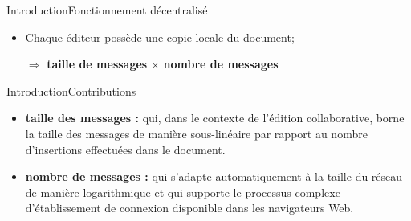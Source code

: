 \begin{frame}{Introduction}{Fonctionnement décentralisé}
  
  \hspace{-1cm}
  \begin{minipage}{0.42\textwidth}
    \begin{itemize}
      \item Chaque éditeur possède une copie locale du document;
      \vspace{0.5cm}

    \end{itemize}
  \end{minipage}
  \begin{minipage}{0.56\textwidth}
    \begin{center}
      
    \end{center}
  \end{minipage}
  
  \vspace{0.4cm}
  \large
  \begin{itemize}
  \item [$\Rightarrow$] \textbf{taille de messages} $\times$ \textbf{nombre de messages}
  \end{itemize}

\end{frame}

\begin{frame}{Introduction}{Contributions}
  
  
  \begin{itemize}
  \item \textbf{taille des messages :} \LSEQ qui, dans le contexte de l'édition
    collaborative, borne la taille des messages de manière sous-linéaire par
    rapport au nombre d'insertions effectuées dans le document.
    \vspace{1cm}
  \item \textbf{nombre de messages :} \SPRAY qui s'adapte automatiquement à la
    taille du réseau de manière logarithmique et qui supporte le processus
    complexe d'établissement de connexion disponible dans les navigateurs Web.
  \end{itemize}

\end{frame}


